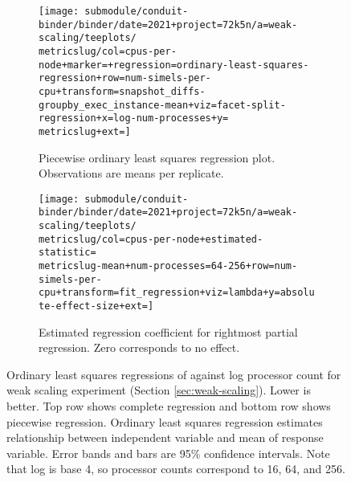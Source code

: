 \begin{figure*}[h]
  \begin{subfigure}[b]{0.49\textwidth}
    \centering
    \texttt{[image: submodule/conduit-binder/binder/date=2021+project=72k5n/a=weak-scaling/teeplots/\\metricslug/col=cpus-per-node+marker=+regression=ordinary-least-squares-regression+row=num-simels-per-cpu+transform=snapshot\_diffs-groupby\_exec\_instance-mean+viz=facet-split-regression+x=log-num-processes+y=\\metricslug+ext=]}
    \caption{
      Piecewise ordinary least squares regression plot.
      Observations are means per replicate.
    }
    \label{fig:weak-scaling-regression-ols-\metricslug-partial-regression}
  \end{subfigure}%
  \hfill%
  \begin{subfigure}[b]{0.49\textwidth}
    \centering
    \texttt{[image: submodule/conduit-binder/binder/date=2021+project=72k5n/a=weak-scaling/teeplots/\\metricslug/col=cpus-per-node+estimated-statistic=\\metricslug-mean+num-processes=64-256+row=num-simels-per-cpu+transform=fit\_regression+viz=lambda+y=absolute-effect-size+ext=]}
    \caption{Estimated regression coefficient for rightmost partial regression. Zero corresponds to no effect.}
    \label{fig:weak-scaling-regression-ols-\metricslug-partial-effect-size}
  \end{subfigure}
  \caption{
  Ordinary least squares regressions of \metric{} against log processor count for weak scaling experiment (Section \ref{sec:weak-scaling}).
  Lower is better.
  Top row shows complete regression and bottom row shows piecewise regression.
  Ordinary least squares regression estimates relationship between independent variable and mean of response variable.
  Error bands and bars are 95\% confidence intervals.
  Note that log is base 4, so processor counts correspond to 16, 64, and 256.
  }
  \label{fig:weak-scaling-regression-ols-\metricslug}
\end{figure*}
